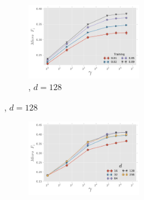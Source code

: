 \begin{figure}[t!]
\begin{subfigure}[b]{\columnwidth}
\begin{subfigure}[b]{\columnwidth}
\begin{subfigure}[b]{0.5\columnwidth}
	                \includegraphics[width=\columnwidth]{figures/stability/flickr_training_vs_walks_per_node}%
				    \addtocounter{subfigure}{-1}%
			        \renewcommand\thesubfigure{\alph{subfigure}2}%
	                \caption{\flickr, $d=128$}
	                \label{fig:stability_flickr-passes_vs_training}	                
	        \end{subfigure}%
        \end{subfigure}%
		\hfill
		\begin{subfigure}[b]{\columnwidth}        
        \begin{subfigure}{0.5\columnwidth}
                \includegraphics[width=\columnwidth]{figures/stability/blogcatalog_dims_vs_walks_per_node.pdf}%

\end{subfigure}
\end{subfigure}
\end{subfigure}
\end{figure}
